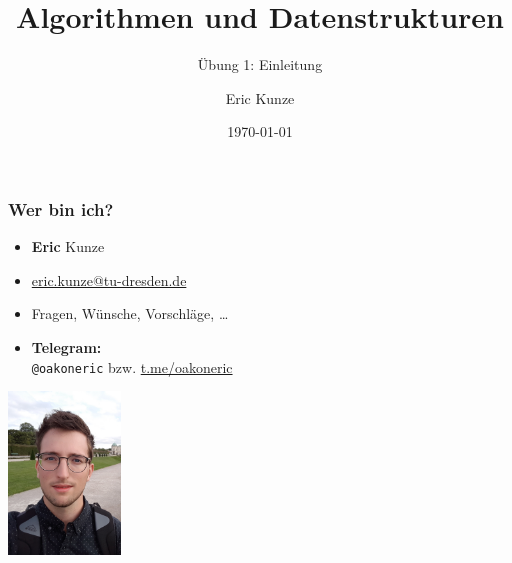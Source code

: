 \documentclass{beamer}
\begin{document}
	
	\title{Algorithmen und Datenstrukturen}
	\subtitle{Übung 1: Einleitung}
	\author{Eric Kunze}
	\date{\today}

	\maketitle
	
	\begin{frame} \frametitle{Wer bin ich?}
		\begin{minipage}{\dimexpr0.75\linewidth-\fboxrule-\fboxsep}
			\flushleft
			\begin{itemize}
				\item \textbf{Eric} \textcolor{cdgray!50}{Kunze}
				\item \url{eric.kunze@tu-dresden.de}
				\item Fragen, Wünsche, Vorschläge, \dots 
				\item \textbf{Telegram:} \\ 
				\texttt{@oakoneric} bzw. \url{t.me/oakoneric}
			\end{itemize}
		\end{minipage}
		\begin{minipage}{\dimexpr0.25\linewidth-\fboxrule-\fboxsep}
			\includegraphics[width=3cm]{./tut01_pic.jpg}
		\end{minipage}		
	\end{frame}
\end{document}
